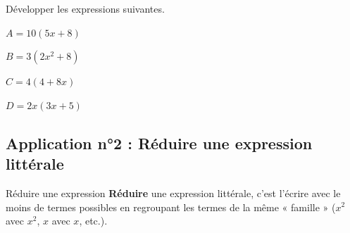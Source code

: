 \documentclass[a4paper]{book}
\begin{document}
    
    \begin{exemple}
        Développer les expressions suivantes.

        \medskip
        
        \begin{minipage}[t]{0.24\textwidth}
            $A = 10(5x + 8)$ \\

            \vspace{1.5cm}
        \end{minipage}
        \hfill \vline \hfill
        \begin{minipage}[t]{0.24\textwidth}
            $B = 3(2x^2 + 8)$ \\

            \vspace{1.5cm}
        \end{minipage}
        \hfill \vline \hfill
        \begin{minipage}[t]{0.24\textwidth}
            $C = 4(4 + 8x)$ \\

            \vspace{1.5cm}
        \end{minipage}
        \hfill \vline \hfill
        \begin{minipage}[t]{0.24\textwidth}
            $D = 2x(3x + 5)$ \\

            \vspace{1.5cm}
        \end{minipage}
        \vspace{0.5cm}
    \end{exemple}


\subsection{Application n°2 : Réduire une expression littérale}

    \begin{definitionTitre}{Réduire une expression}
        \textbf{Réduire} une expression littérale, c'est l'écrire avec le moins de termes possibles en regroupant les termes de la même « famille » ($x^2$ avec $x^2$, $x$ avec $x$, etc.).
    \end{definitionTitre}
\end{document}
